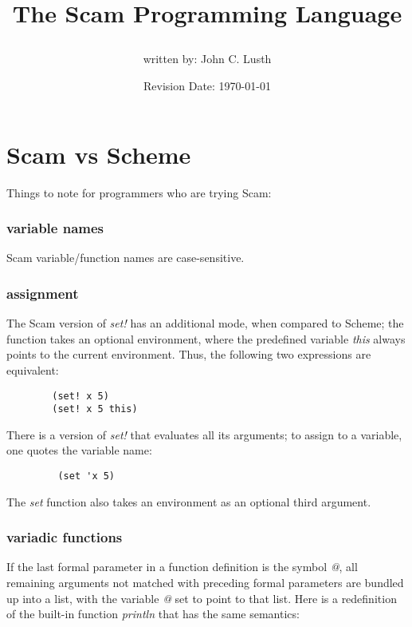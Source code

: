 \documentclass{article}
\title{The Scam Programming Language\\
\date{Revision Date: \today}
}
\author{written by: John C. Lusth}
\begin{document}
\maketitle

\W\subsubsection{}
\W\htmlrule


\section{Scam vs Scheme}

Things to note for programmers who are trying Scam:

\subsubsection*{variable names}

    Scam variable/function names are case-sensitive.

\subsubsection*{assignment}

    The Scam version of {\it set!} has an additional mode, when compared to
    Scheme;
    the function takes an optional environment,
    where the predefined
    variable {\it this} always points to the current environment.
    Thus, the following
    two expressions are equivalent:

\begin{verbatim}
        (set! x 5)
        (set! x 5 this)
\end{verbatim}

    There is a version of {\it set!} that evaluates all its arguments;
    to assign to a variable, one quotes the variable name:

\begin{verbatim}
         (set 'x 5)
\end{verbatim}

    The {\it set} function
    also takes an environment as an optional third argument.

\subsubsection*{variadic functions}

    If the last formal parameter in a function definition is the
    symbol {\it @}, all remaining arguments not matched with 
    preceding formal parameters are bundled up into a list, with
    the variable {\it @} set to point to that list. Here is a redefinition
    of the built-in function {\it println} that has the same semantics:
\end{document}
